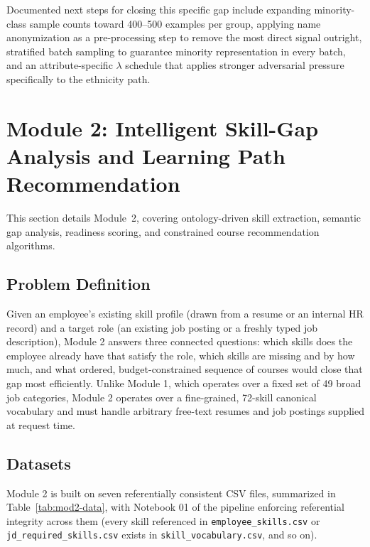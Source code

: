 \documentclass[11pt,a4paper]{article}
\newcommand{\code}[1]{\texttt{\footnotesize #1}}
\begin{document}
Documented next steps for closing this specific gap include expanding minority-class sample counts toward 400--500 examples per group, applying name anonymization as a pre-processing step to remove the most direct signal outright, stratified batch sampling to guarantee minority representation in every batch, and an attribute-specific $\lambda$ schedule that applies stronger adversarial pressure specifically to the ethnicity path.

\clearpage
\section[Module 2: Skill-Gap Analysis]{Module 2: Intelligent Skill-Gap Analysis and Learning Path Recommendation}
\label{sec:mod2}

This section details Module~2, covering ontology-driven skill extraction, semantic gap analysis, readiness scoring, and constrained course recommendation algorithms.

\subsection{Problem Definition}

Given an employee's existing skill profile (drawn from a resume or an internal HR record) and a target role (an existing job posting or a freshly typed job description), Module 2 answers three connected questions: which skills does the employee already have that satisfy the role, which skills are missing and by how much, and what ordered, budget-constrained sequence of courses would close that gap most efficiently. Unlike Module 1, which operates over a fixed set of 49 broad job categories, Module 2 operates over a fine-grained, 72-skill canonical vocabulary and must handle arbitrary free-text resumes and job postings supplied at request time.

\subsection{Datasets}
\label{sec:mod2-data}

Module 2 is built on seven referentially consistent CSV files, summarized in Table~\ref{tab:mod2-data}, with Notebook 01 of the pipeline enforcing referential integrity across them (every skill referenced in \code{employee\_skills.csv} or \code{jd\_required\_skills.csv} exists in \code{skill\_vocabulary.csv}, and so on).
\end{document}
